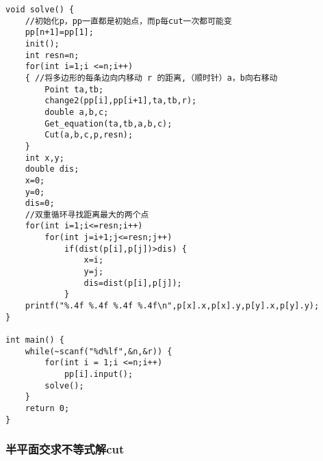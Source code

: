\begin{lstlisting}
void solve() {
	//初始化p，pp一直都是初始点，而p每cut一次都可能变
	pp[n+1]=pp[1];
	init();
	int resn=n;
	for(int i=1;i <=n;i++)
	{ //将多边形的每条边向内移动 r 的距离,（顺时针）a，b向右移动
		Point ta,tb;
		change2(pp[i],pp[i+1],ta,tb,r);
		double a,b,c;
		Get_equation(ta,tb,a,b,c);
		Cut(a,b,c,p,resn);
	}
	int x,y;
	double dis;
	x=0;
	y=0;
	dis=0;
	//双重循环寻找距离最大的两个点
	for(int i=1;i<=resn;i++)
		for(int j=i+1;j<=resn;j++)
			if(dist(p[i],p[j])>dis) {
				x=i;
				y=j;
				dis=dist(p[i],p[j]);
			}
	printf("%.4f %.4f %.4f %.4f\n",p[x].x,p[x].y,p[y].x,p[y].y);
}

int main() {
	while(~scanf("%d%lf",&n,&r)) {
		for(int i = 1;i <=n;i++)
			pp[i].input();
		solve();
	}
	return 0;
}
\end{lstlisting}

\subsubsection{半平面交求不等式解cut}
